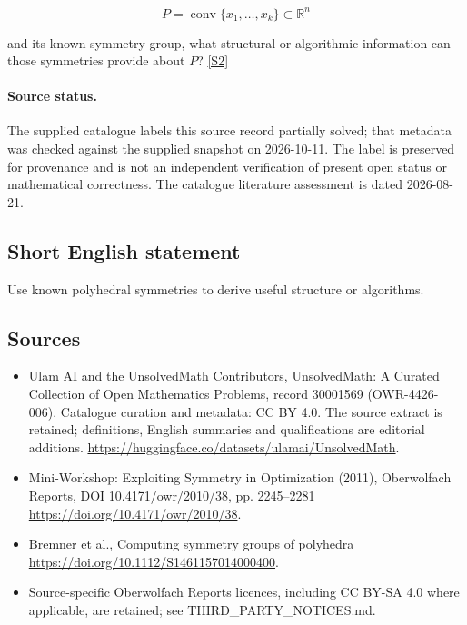 \documentclass[11pt]{article}
\begin{document}
$$P=\operatorname{conv}\{x_1,\ldots,x_k\}\subset\mathbb R^n$$

and its known symmetry group, what structural or algorithmic information can those symmetries provide about $P$? \href{https://doi.org/10.4171/owr/2010/38}{[S2]}
\paragraph{Source status.}
The supplied catalogue labels this source record partially solved; that metadata was checked against the supplied snapshot on 2026-10-11. The label is preserved for provenance and is not an independent verification of present open status or mathematical correctness. The catalogue literature assessment is dated 2026-08-21.
\subsection{Short English statement}
Use known polyhedral symmetries to derive useful structure or algorithms.
\subsection{Sources}
\begin{itemize}
\item[S1] Ulam AI and the UnsolvedMath Contributors, UnsolvedMath: A Curated Collection of Open Mathematics Problems, record 30001569 (OWR-4426-006). Catalogue curation and metadata: CC BY 4.0. The source extract is retained; definitions, English summaries and qualifications are editorial additions.
\url{https://huggingface.co/datasets/ulamai/UnsolvedMath}.
\item[S2] Mini-Workshop: Exploiting Symmetry in Optimization (2011), Oberwolfach Reports, DOI 10.4171/owr/2010/38, pp. 2245--2281
\url{https://doi.org/10.4171/owr/2010/38}.
\item[S3] Bremner et al., Computing symmetry groups of polyhedra
\url{https://doi.org/10.1112/S1461157014000400}.
\item Source-specific Oberwolfach Reports licences, including CC BY-SA 4.0 where applicable, are retained; see THIRD\_PARTY\_NOTICES.md.
\end{itemize}
\end{document}

